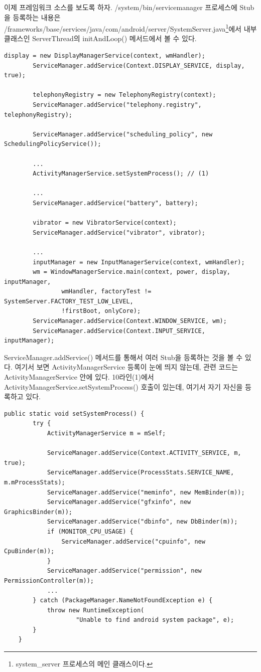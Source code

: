 이제 프레임워크 소스를 보도록 하자.
/system/bin/servicemanager 프로세스에 Stub을 등록하는 내용은 /frameworks/base/services/java/com/android/server/SystemServer.java\footnote{system\_server 프로세스의 메인 클래스이다.}에서 내부 클래스인 ServerThread의 initAndLoop() 메서드에서 볼 수 있다.

\begin{lstlisting}[frame=single, caption=SystemServer.java] 
	    display = new DisplayManagerService(context, wmHandler);
	    ServiceManager.addService(Context.DISPLAY_SERVICE, display, true);
	
	    telephonyRegistry = new TelephonyRegistry(context);
	    ServiceManager.addService("telephony.registry", telephonyRegistry);
	
	    ServiceManager.addService("scheduling_policy", new SchedulingPolicyService());
		
		...
		ActivityManagerService.setSystemProcess(); // (1)
		
		...
	    ServiceManager.addService("battery", battery);
	
	    vibrator = new VibratorService(context);
	    ServiceManager.addService("vibrator", vibrator);
	
		...
	    inputManager = new InputManagerService(context, wmHandler);
	    wm = WindowManagerService.main(context, power, display, inputManager,
	            wmHandler, factoryTest != SystemServer.FACTORY_TEST_LOW_LEVEL,
	            !firstBoot, onlyCore);
	    ServiceManager.addService(Context.WINDOW_SERVICE, wm);
	    ServiceManager.addService(Context.INPUT_SERVICE, inputManager);
\end{lstlisting}	    
ServiceManager.addService() 메서드를 통해서 여러 Stub을 등록하는 것을 볼 수 있다.
여기서 보면 ActivityManagerService 등록이 눈에 띄지 않는데, 관련 코드는 ActivityManagerService 안에 있다. 10라인(1)에서 ActivityManagerService.setSystemProcess() 호출이 있는데, 여기서 자기 자신을 등록하고 있다.\\
\begin{lstlisting}[frame=single, caption=ActivityManagerService.java] 
   public static void setSystemProcess() {
        try {
            ActivityManagerService m = mSelf;

            ServiceManager.addService(Context.ACTIVITY_SERVICE, m, true);
            ServiceManager.addService(ProcessStats.SERVICE_NAME, m.mProcessStats);
            ServiceManager.addService("meminfo", new MemBinder(m));
            ServiceManager.addService("gfxinfo", new GraphicsBinder(m));
            ServiceManager.addService("dbinfo", new DbBinder(m));
            if (MONITOR_CPU_USAGE) {
                ServiceManager.addService("cpuinfo", new CpuBinder(m));
            }
            ServiceManager.addService("permission", new PermissionController(m));
 			...
        } catch (PackageManager.NameNotFoundException e) {
            throw new RuntimeException(
                    "Unable to find android system package", e);
        }
    }
\end{lstlisting}	    


